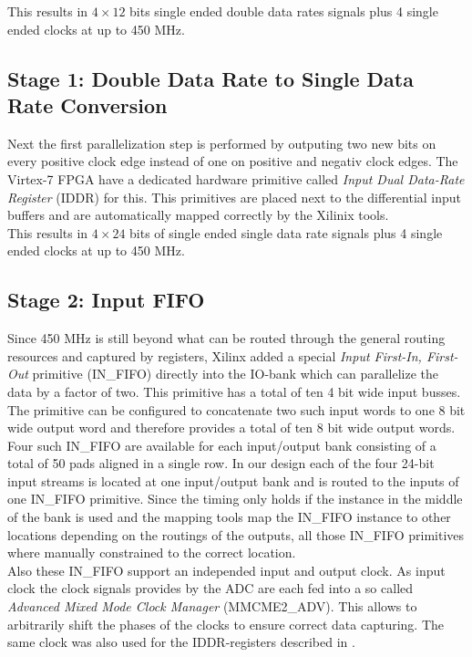 This results in $4 \times 12$ bits single ended double data rates
signals plus 4 single ended clocks at up to 450 MHz.

\subsection{Stage 1: Double Data Rate to Single Data Rate Conversion}
\label{sec:fpga_adc_s1}
Next the first parallelization step is performed by outputing two new
bits on every positive clock edge instead of one on positive and negativ
clock edges. The Virtex-7 \gls{FPGA} have a dedicated hardware primitive
called {\em Input Dual Data-Rate Register} (IDDR) for this.
This primitives are placed next to the differential input buffers
and are automatically mapped correctly by the Xilinix tools. \\

This results in $4 \times 24$ bits of single ended single data rate
signals plus 4 single ended clocks at up to 450 MHz.

\subsection{Stage 2: Input FIFO}
Since 450 MHz is still beyond what can be routed through the general
routing resources and captured by registers, Xilinx added a special
{\em Input First-In, First-Out} primitive (IN\_FIFO)
directly into the IO-bank which can parallelize the data by a factor of two.
This primitive has a total of ten 4 bit wide input busses.
The primitive can be configured to concatenate two such input words
to one 8 bit wide output word and therefore provides a total of
ten 8 bit wide output words. \\

Four such IN\_FIFO are available for each
input/output bank consisting of a total of 50 pads aligned in a single row.
In our design each of the four 24-bit input streams is located at one
input/output bank and is routed to the inputs of one IN\_FIFO primitive.
Since the timing only holds if the instance in the middle of the bank
is used and the mapping tools map the IN\_FIFO instance to other
locations depending on the routings of the outputs, all those
IN\_FIFO primitives where manually constrained to the correct location. \\

Also these IN\_FIFO support an independed input and output clock.
As input clock the clock signals provides by the \gls{ADC} are each fed
into a so called {\em Advanced Mixed Mode Clock Manager} (MMCME2\_ADV).
This allows to arbitrarily shift the phases of the clocks to ensure
correct data capturing. The same clock was also used for the
IDDR-registers described in . \\


